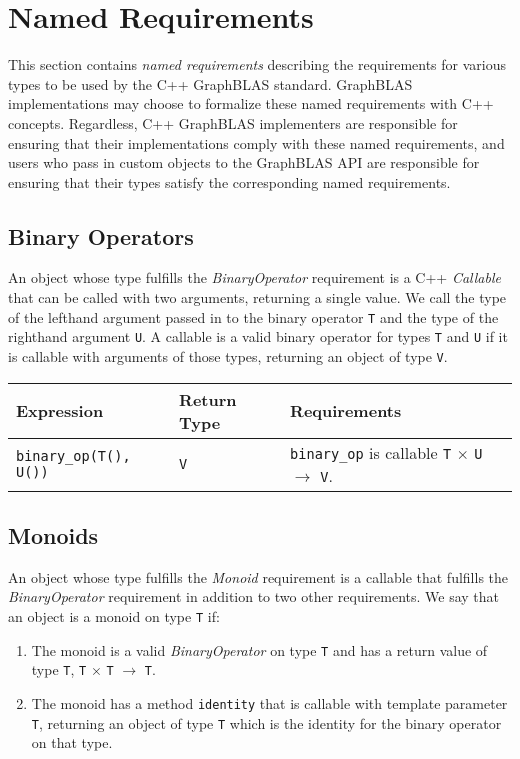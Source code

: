 \section{Named Requirements}
This section contains \textit{named requirements} describing the requirements for
various types to be used by the C++ GraphBLAS standard.
GraphBLAS implementations may choose to formalize these named requirements with
C++ concepts.  Regardless, C++ GraphBLAS implementers are responsible for
ensuring that their implementations comply with these named requirements, and
users who pass in custom objects to the GraphBLAS API are responsible for
ensuring that their types satisfy the corresponding named requirements.

\subsection{Binary Operators}
An object whose type fulfills the \textit{BinaryOperator} requirement is a C++
\textit{Callable} that can be called with two arguments, returning a single
value.  We call the type of the lefthand argument passed in to the binary operator
\texttt{T} and the type of the righthand argument \texttt{U}.  A callable is a
valid binary operator for types \texttt{T} and \texttt{U} if it is callable with
arguments of those types, returning an object of type \texttt{V}.

\begin{tabularx}{\textwidth}{l l X}
\textbf{Expression} & \textbf{Return Type} & \textbf{Requirements}\\
\hline
\texttt{binary\_op(T(), U())} & \texttt{V} & \texttt{binary\_op} is callable \texttt{T} $\times$ \texttt{U} $\rightarrow$ \texttt{V}.\\
\end{tabularx}

\subsection{Monoids}
An object whose type fulfills the \textit{Monoid} requirement is a callable that
fulfills the \textit{BinaryOperator} requirement in addition to two other requirements.
We say that an object is a monoid on type \texttt{T} if:

\begin{enumerate}
   \item The monoid is a valid \textit{BinaryOperator} on type \texttt{T} and has a return value of type \texttt{T}, \texttt{T} $\times$ \texttt{T} $\rightarrow$ \texttt{T}.
   \item The monoid has a method \texttt{identity} that is callable with template parameter \texttt{T}, returning an object of type \texttt{T} which is the identity for the binary operator on that type.
\end{enumerate}

